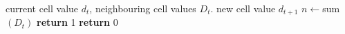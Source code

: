 \begin{algorithmic}[1]
  \Require current cell value $d_t$, neighbouring cell values $D_t$.
  \Ensure new cell value $d_{t+1}$
  \State $n \leftarrow $sum$(D_t)$
  \State \textbf{return} 1
  \Else
  \State \textbf{return} 0
  \EndIf
\end{algorithmic}
